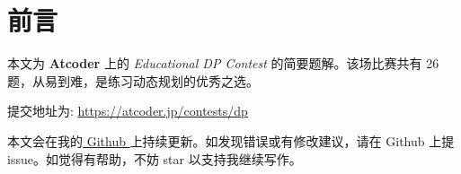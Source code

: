 \maketitle
\tableofcontents
\newpage
\section*{前言}

本文为 \textbf{Atcoder} 上的 \emph{Educational DP Contest} 的简要题解。该场比赛共有 26 题，从易到难，是练习动态规划的优秀之选。

提交地址为: \url{ https://atcoder.jp/contests/dp}


本文会在我的\href{https://github.com/SamZhangQingChuan/Editorials/tree/master/Atcoder%20Educational%20DP%20Contest%20Editorial}{ Github }上持续更新。如发现错误或有修改建议，请在 Github 上提 issue。如觉得有帮助，不妨 star 以支持我继续写作。

\newpage
